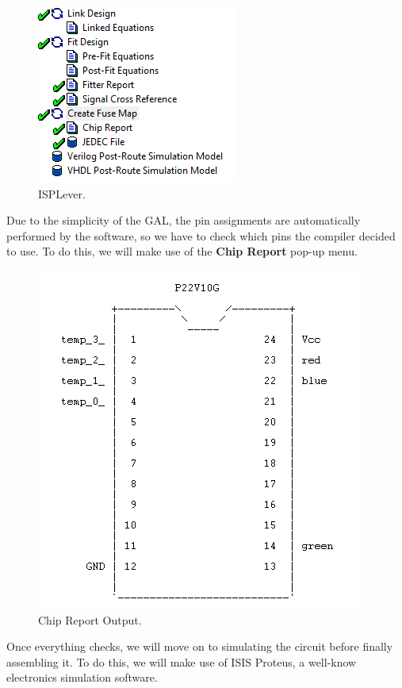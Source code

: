 \begin{figure}[H]
    \centering
    \includegraphics[scale = 0.85]{Graphics/VHDL/Practice 1/ISPLever.PNG}
    \caption{ISPLever.}
    \label{fig:ISPLever}
\end{figure}

Due to the simplicity of the GAL, the pin assignments are automatically performed by the software, so we have to check which pins the compiler decided to use. To do this, we will make use of the \textbf{Chip Report} pop-up menu.

\begin{figure}[H]
    \centering
    \includegraphics[scale=0.7]{Graphics/VHDL/Practice 1/Chip_Report.PNG}
    \caption{Chip Report Output.}
    \label{fig:CHIP_REPORT}
\end{figure}

\newpage

Once everything checks, we will move on to simulating the circuit before finally assembling it. To do this, we will make use of ISIS Proteus, a well-know electronics simulation software.\medskip

